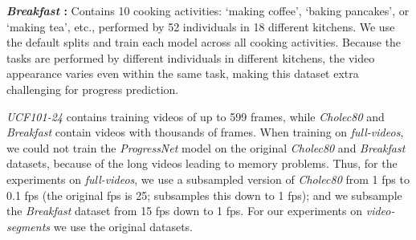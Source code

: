\smallskip\noindent\textbf{\textsl{Breakfast} \cite{kuehne2014, kuehne2016}:} Contains 10 cooking activities: \eg `making coffee', `baking pancakes', or `making tea', etc., performed by 52 individuals in 18 different kitchens. 
We use the default splits and train each model across all cooking activities. 
Because the tasks are performed by different individuals in different kitchens, the video appearance varies even within the same task, making this dataset extra challenging for progress prediction.

\textsl{UCF101-24} contains training videos of up to 599 frames, while \textsl{Cholec80} and \textsl{Breakfast} contain videos with thousands of frames.
When training on \textsl{full-videos}, we could not train the \textsl{ProgressNet} model on the original \textsl{Cholec80} and \textsl{Breakfast} datasets, because of the long videos leading to memory problems.
Thus, for the experiments on \textsl{full-videos}, we use a subsampled version of \textsl{Cholec80} from 1 fps to 0.1 fps (the original fps is 25; \cite{twinanda2019} subsamples this down to 1 fps); and we subsample the \textsl{Breakfast} dataset from 15 fps down to 1 fps. 
For our experiments on \textsl{video-segments} we use the original datasets.

